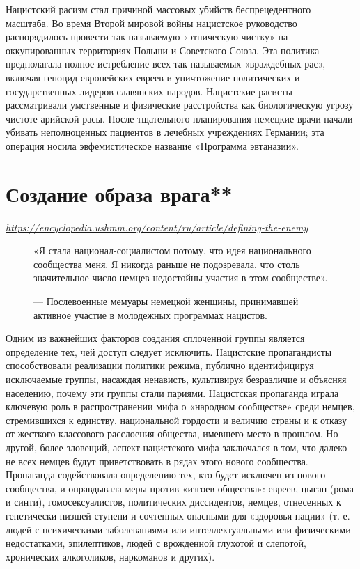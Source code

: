 Нацистский расизм стал причиной массовых убийств беспрецедентного масштаба. Во время Второй мировой войны нацистское руководство распорядилось провести так называемую «этническую чистку» на оккупированных территориях Польши и Советского Союза. Эта политика предполагала полное истребление всех так называемых «враждебных рас», включая геноцид европейских евреев и уничтожение политических и государственных лидеров славянских народов. Нацистские расисты рассматривали умственные и физические расстройства как биологическую угрозу чистоте арийской расы. После тщательного планирования немецкие врачи начали убивать неполноценных пациентов в лечебных учреждениях Германии; эта операция носила эвфемистическое название «Программа эвтаназии».

\newpage
\section{Создание образа врага**}

\textit{\url{https://encyclopedia.ushmm.org/content/ru/article/defining-the-enemy}}

\begin{figure}
    \begin{fancyquotes}
        «Я стала национал-социалистом потому, что идея национального сообщества  меня. Я никогда раньше не подозревала, что столь значительное число немцев недостойны участия в этом сообществе».\\[1em]

        \begin{flushright}
            --- Послевоенные мемуары немецкой женщины, принимавшей активное участие в молодежных программах нацистов.
        \end{flushright}
    \end{fancyquotes}
\end{figure}
Одним из важнейших факторов создания сплоченной группы является определение тех, чей доступ следует исключить. Нацистские пропагандисты способствовали реализации политики режима, публично идентифицируя исключаемые группы, насаждая ненависть, культивируя безразличие и объясняя населению, почему эти группы стали париями. Нацистская пропаганда играла ключевую роль в распространении мифа о «народном сообществе» среди немцев, стремившихся к единству, национальной гордости и величию страны и к отказу от жесткого классового расслоения общества, имевшего место в прошлом. Но другой, более зловещий, аспект нацистского мифа заключался в том, что далеко не всех немцев будут приветствовать в рядах этого нового сообщества. Пропаганда содействовала определению тех, кто будет исключен из нового сообщества, и оправдывала меры против «изгоев общества»: евреев, цыган (рома и синти), гомосексуалистов, политических диссидентов, немцев, отнесенных к генетически низшей ступени и сочтенных опасными для «здоровья нации» (т. е. людей с психическими заболеваниями или интеллектуальными или физическими недостатками, эпилептиков, людей с врожденной глухотой и слепотой, хронических алкоголиков, наркоманов и других).

